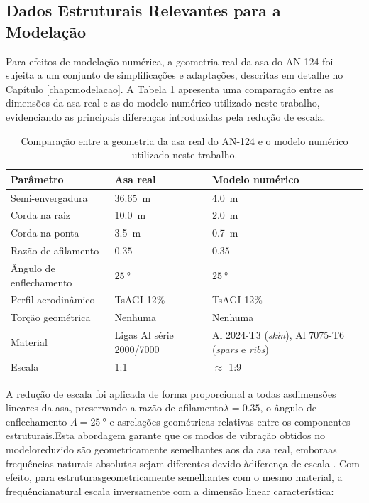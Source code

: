 \documentclass[a4paper,fleqn,noprintline]{cas-dc}
\begin{document}
\subsection{Dados Estruturais Relevantes para a Modelação}

Para efeitos de modelação numérica, a geometria real da asa do AN-124 foi sujeita a um conjunto de simplificações e adaptações, descritas em detalhe no Capítulo \ref{chap:modelacao}. A Tabela \ref{tab:modelo_vs_real} apresenta uma comparação entre as dimensões da asa real e as do modelo numérico utilizado neste trabalho, evidenciando as principais diferenças introduzidas pela redução de escala.

\begin{table}[h!]
\centering
\caption{Comparação entre a geometria da asa real do AN-124 e o 
modelo numérico utilizado neste trabalho.}
\label{tab:modelo_vs_real}
\renewcommand{\arraystretch}{1.4}
\begin{tabularx}{\textwidth}{p{4.5cm} X X}
\toprule
\textbf{Parâmetro} & \textbf{Asa real} & \textbf{Modelo numérico} \\
\midrule
Semi-envergadura        & \SI{36.65}{\meter}    & \SI{4.0}{\meter} \\
Corda na raiz           & \SI{10.0}{\meter}     & \SI{2.0}{\meter} \\
Corda na ponta          & \SI{3.5}{\meter}      & \SI{0.7}{\meter} \\
Razão de afilamento     & $0.35$                & $0.35$ \\
Ângulo de enflechamento & $\qty{25}{\degree}$   & $\qty{25}{\degree}$ \\
Perfil aerodinâmico     & TsAGI 12\%            & TsAGI 12\% \\
Torção geométrica       & Nenhuma               & Nenhuma \\
Material & Ligas Al série 2000/7000 & Al 2024-T3 (\textit{skin}), Al 7075-T6 (\textit{spars} e \textit{ribs}) \\
Escala                  & 1:1                   & $\approx$ 1:9 \\
\bottomrule
\end{tabularx}
\end{table}

A redução de escala foi aplicada de forma proporcional a todas asdimensões lineares da asa, preservando a razão de afilamento$\lambda = 0.35$, o ângulo de enflechamento $\Lambda = \qty{25}{\degree}$ e asrelações geométricas relativas entre os componentes estruturais.Esta abordagem garante que os modos de vibração obtidos no modeloreduzido são geometricamente semelhantes aos da asa real, emboraas frequências naturais absolutas sejam diferentes devido àdiferença de escala \cite{Craig2006}. Com efeito, para estruturasgeometricamente semelhantes com o mesmo material, a frequêncianatural escala inversamente com a dimensão linear característica:
\end{document}
